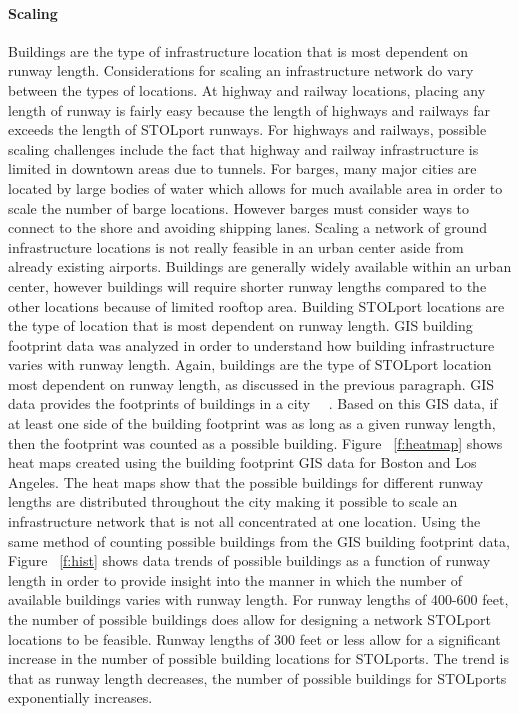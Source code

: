 \documentclass[]{aiaa-tc}%
\begin{document}
\paragraph{Scaling}
Buildings are the type of infrastructure location that is most dependent on runway length. Considerations for scaling an infrastructure network do vary between the types of locations. At highway and railway locations, placing any length of runway is fairly easy because the length of highways and railways far exceeds the length of STOLport runways. For highways and railways, possible scaling challenges include the fact that highway and railway infrastructure is limited in downtown areas due to tunnels. For barges, many major cities are located by large bodies of water which allows for much available area in order to scale the number of barge locations. However barges must consider ways to connect to the shore and avoiding shipping lanes. Scaling a network of ground infrastructure locations is not really feasible in an urban center aside from already existing airports. Buildings are generally widely available within an urban center, however buildings will require shorter runway lengths compared to the other locations because of limited rooftop area. Building STOLport locations are the type of location that is most dependent on runway length.
	GIS building footprint data was analyzed in order to understand how building infrastructure varies with runway length. Again, buildings are the type of STOLport location most dependent on runway length, as discussed in the previous paragraph. GIS data provides the footprints of buildings in a city ~\cite{GIS_MA}~\cite{GIS_CA}. Based on this GIS data, if at least one side of the building footprint was as long as a given runway length, then the footprint was counted as a possible building. Figure ~\ref{f:heatmap} shows heat maps created using the building footprint GIS data for Boston and Los Angeles. The heat maps show that the possible buildings for different runway lengths are distributed throughout the city making it possible to scale an infrastructure network that is not all concentrated at one location. Using the same method of counting possible buildings from the GIS building footprint data, Figure ~\ref{f:hist} shows data trends of possible buildings as a function of runway length in order to provide insight into the manner in which the number of available buildings varies with runway length. For runway lengths of 400-600 feet, the number of possible buildings does allow for designing a network STOLport locations to be feasible. Runway lengths of 300 feet or less allow for a significant increase in the number of possible building locations for STOLports. The trend is that as runway length decreases, the number of possible buildings for STOLports exponentially increases.
\end{document}
